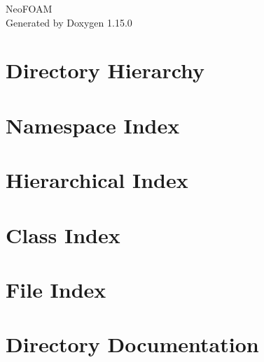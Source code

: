 \documentclass[twoside]{book}
\newcommand{\+}{\discretionary{\mbox{\scriptsize$\hookleftarrow$}}{}{}}
\newcommand{\clearemptydoublepage}{%
    \newpage{\pagestyle{empty}\cleardoublepage}%
  }
\begin{document}
  \raggedbottom
    \hypersetup{pageanchor=false,
                bookmarksnumbered=true,
                pdfencoding=unicode
               }
  \begin{titlepage}
  \vspace*{7cm}
  \begin{center}%
  {\Large Neo\+FOAM}\\
  \vspace*{1cm}
  {\large Generated by Doxygen 1.15.0}\\
  \end{center}
  \end{titlepage}
  \clearemptydoublepage
  \tableofcontents
  \clearemptydoublepage
  \hypersetup{pageanchor=true}
\chapter{Directory Hierarchy}

\chapter{Namespace Index}

\chapter{Hierarchical Index}

\chapter{Class Index}

\chapter{File Index}

\chapter{Directory Documentation}














\end{document}
